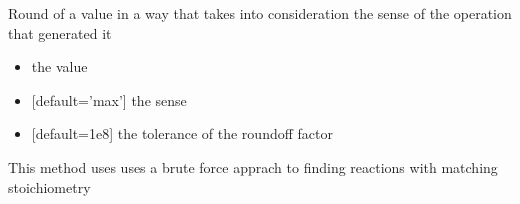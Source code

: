 \documentclass[letterpaper,10pt,english]{sphinxmanual}
\begin{document}
\begin{fulllineitems}
\label{\detokenize{modules_doc:cbmpy.CBTools.roundOffWithSense}}
\pysigstartsignatures
{}
\pysigstopsignatures
\sphinxAtStartPar
Round of a value in a way that takes into consideration the sense of the operation that generated it
\begin{itemize}
\item {} 
\sphinxAtStartPar
{} the value

\item {} 
\sphinxAtStartPar
{} {[}default=’max’{]} the sense

\item {} 
\sphinxAtStartPar
{} {[}default=1e\sphinxhyphen{}8{]} the tolerance of the roundoff factor

\end{itemize}

\end{fulllineitems}


\begin{fulllineitems}
\label{\detokenize{modules_doc:cbmpy.CBTools.scanForReactionDuplicates}}
\pysigstartsignatures
{}
\pysigstopsignatures
\sphinxAtStartPar
This method uses uses a brute force apprach to finding reactions with matching
stoichiometry

\end{fulllineitems}

\end{document}
